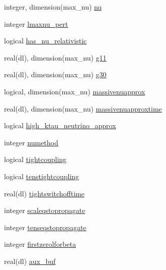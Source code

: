 \begin{DoxyCompactItemize}
integer, dimension(max\+\_\+nu) \mbox{\hyperlink{structgaugeinterface_1_1evolutionvars_a18e78ebe8c8a01adb4438ade7bd39158}{nq}}
\item 
integer \mbox{\hyperlink{structgaugeinterface_1_1evolutionvars_acf4b44c7a8c4ec01ef7f4c47e589a762}{lmaxnu\+\_\+pert}}
\item 
logical \mbox{\hyperlink{structgaugeinterface_1_1evolutionvars_a2faf3959fb38d91f7ba16224dd309f34}{has\+\_\+nu\+\_\+relativistic}}
\item 
real(dl), dimension(max\+\_\+nu) \mbox{\hyperlink{structgaugeinterface_1_1evolutionvars_aa26eff4bbc27560cc254893d57a6156c}{g11}}
\item 
real(dl), dimension(max\+\_\+nu) \mbox{\hyperlink{structgaugeinterface_1_1evolutionvars_a3573935cfd7ed78a19a5bab696599b92}{g30}}
\item 
logical, dimension(max\+\_\+nu) \mbox{\hyperlink{structgaugeinterface_1_1evolutionvars_a646355ae3da425cef11e160cff9f9a64}{massivenuapprox}}
\item 
real(dl), dimension(max\+\_\+nu) \mbox{\hyperlink{structgaugeinterface_1_1evolutionvars_a90cfa31739a93472d0d7052864057286}{massivenuapproxtime}}
\item 
logical \mbox{\hyperlink{structgaugeinterface_1_1evolutionvars_af033a1ce2a513a7c7aeda3d20701b747}{high\+\_\+ktau\+\_\+neutrino\+\_\+approx}}
\item 
integer \mbox{\hyperlink{structgaugeinterface_1_1evolutionvars_acfafcdd457c1f35ec25c77eea711317d}{numethod}}
\item 
logical \mbox{\hyperlink{structgaugeinterface_1_1evolutionvars_a6e8b8c84547efb487d757148098b8175}{tightcoupling}}
\item 
logical \mbox{\hyperlink{structgaugeinterface_1_1evolutionvars_a30e5d047ab9bc77815cbb792c5b2b1a0}{tenstightcoupling}}
\item 
real(dl) \mbox{\hyperlink{structgaugeinterface_1_1evolutionvars_ab871119ea049c6a5daa1d3ebbe7b2bfc}{tightswitchofftime}}
\item 
integer \mbox{\hyperlink{structgaugeinterface_1_1evolutionvars_a91378803600806fad4b020b140c8a1f0}{scaleqstopropagate}}
\item 
integer \mbox{\hyperlink{structgaugeinterface_1_1evolutionvars_a07c66323952c8a32de50c98fe81c727a}{tenseqstopropagate}}
\item 
integer \mbox{\hyperlink{structgaugeinterface_1_1evolutionvars_a1aa75b66416332ce36789b16ff6dda98}{firstzerolforbeta}}
\item 
real(dl) \mbox{\hyperlink{structgaugeinterface_1_1evolutionvars_a711dcaaf4415a021db3f399bf58abd7f}{aux\+\_\+buf}}

\end{DoxyCompactItemize}
